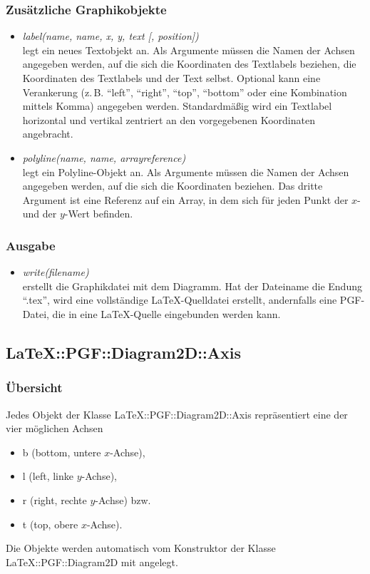 \documentclass[ngerman,origlongtable]{scrartcl}
\begin{document}
\subsubsection{Zusätzliche Graphikobjekte}
\begin{itemize}
\item	\textit{label(name, name, x, y, text [, position])\/}\\
legt ein neues Textobjekt an. Als Argumente müssen die Namen der Achsen
angegeben werden, auf die sich die Koordinaten des Textlabels beziehen,
die Koordinaten des Textlabels und der Text selbst. Optional kann eine
Verankerung (z.\,B. "`left"', "`right"', "`top"', "`bottom"' oder eine
Kombination mittels Komma) angegeben werden.
Standardmäßig wird ein Textlabel horizontal
und vertikal zentriert an den vorgegebenen Koordinaten angebracht.
\item	\textit{polyline(name, name, arrayreference)\/}\\
legt ein Polyline-Objekt an.
Als Argumente müssen die Namen der Achsen
angegeben werden, auf die sich die Koordinaten beziehen.
Das dritte Argument ist eine Referenz auf ein Array, in dem sich für jeden
Punkt der \(x\)- und der \(y\)-Wert befinden.
\end{itemize}
\subsubsection{Ausgabe}
\begin{itemize}
\item	\textit{write(filename)\/}\\
erstellt die Graphikdatei mit dem Diagramm. Hat der Dateiname die Endung
"`.tex"', wird eine vollständige \LaTeX{}-Quelldatei erstellt,
andernfalls eine PGF-Datei, die in eine \LaTeX{}-Quelle eingebunden werden
kann.
\end{itemize}
\clearpage
\subsection[Axis]{LaTeX::PGF::Diagram2D::Axis}
\subsubsection{Übersicht}
Jedes Objekt der Klasse LaTeX::PGF::Diagram2D::Axis repräsentiert eine der vier
möglichen Achsen
\begin{itemize}
\item	b (bottom, untere \(x\)-Achse),
\item	l (left, linke \(y\)-Achse),
\item	r (right, rechte \(y\)-Achse) bzw.
\item	t (top, obere \(x\)-Achse).
\end{itemize}
Die Objekte werden automatisch vom Konstruktor der Klasse
LaTeX::PGF::Diagram2D mit angelegt.
\end{document}
